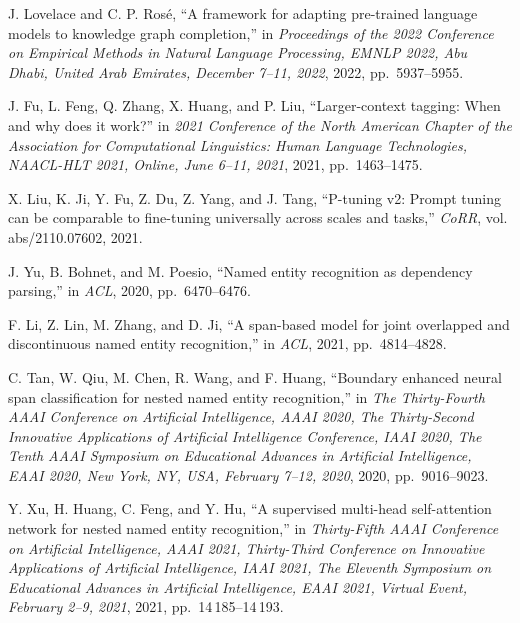 \begin{enumerate}[leftmargin=2em,label={[\arabic*]}]
\item J. Lovelace and C. P. Ros\'{e}, ``A framework for adapting pre-trained language models to knowledge graph completion,'' in \textit{Proceedings of the 2022 Conference on Empirical Methods in Natural Language Processing, EMNLP 2022, Abu Dhabi, United Arab Emirates, December 7--11, 2022}, 2022, pp.~5937--5955.

\item J. Fu, L. Feng, Q. Zhang, X. Huang, and P. Liu, ``Larger-context tagging: When and why does it work?'' in \textit{2021 Conference of the North American Chapter of the Association for Computational Linguistics: Human Language Technologies, NAACL-HLT 2021, Online, June 6--11, 2021}, 2021, pp.~1463--1475.

\item X. Liu, K. Ji, Y. Fu, Z. Du, Z. Yang, and J. Tang, ``P-tuning v2: Prompt tuning can be comparable to fine-tuning universally across scales and tasks,'' \textit{CoRR}, vol. abs/2110.07602, 2021.

\item J. Yu, B. Bohnet, and M. Poesio, ``Named entity recognition as dependency parsing,'' in \textit{ACL}, 2020, pp.~6470--6476.

\item F. Li, Z. Lin, M. Zhang, and D. Ji, ``A span-based model for joint overlapped and discontinuous named entity recognition,'' in \textit{ACL}, 2021, pp.~4814--4828.

\item C. Tan, W. Qiu, M. Chen, R. Wang, and F. Huang, ``Boundary enhanced neural span classification for nested named entity recognition,'' in \textit{The Thirty-Fourth AAAI Conference on Artificial Intelligence, AAAI 2020, The Thirty-Second Innovative Applications of Artificial Intelligence Conference, IAAI 2020, The Tenth AAAI Symposium on Educational Advances in Artificial Intelligence, EAAI 2020, New York, NY, USA, February 7--12, 2020}, 2020, pp.~9016--9023.

\item Y. Xu, H. Huang, C. Feng, and Y. Hu, ``A supervised multi-head self-attention network for nested named entity recognition,'' in \textit{Thirty-Fifth AAAI Conference on Artificial Intelligence, AAAI 2021, Thirty-Third Conference on Innovative Applications of Artificial Intelligence, IAAI 2021, The Eleventh Symposium on Educational Advances in Artificial Intelligence, EAAI 2021, Virtual Event, February 2--9, 2021}, 2021, pp.~14\,185--14\,193.


\end{enumerate}
